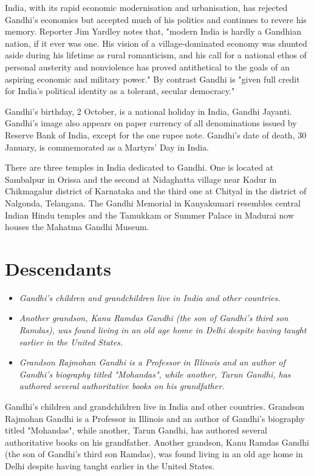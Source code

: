 India, with its rapid economic modernisation and urbanisation, has
rejected Gandhi's economics but accepted much of his politics and
continues to revere his memory. Reporter Jim Yardley notes that, "modern
India is hardly a Gandhian nation, if it ever was one. His vision of a
village-dominated economy was shunted aside during his lifetime as rural
romanticism, and his call for a national ethos of personal austerity and
nonviolence has proved antithetical to the goals of an aspiring economic
and military power." By contrast Gandhi is "given full credit for
India's political identity as a tolerant, secular democracy."

Gandhi's birthday, 2 October, is a national holiday in India, Gandhi
Jayanti. Gandhi's image also appears on paper currency of all
denominations issued by Reserve Bank of India, except for the one rupee
note. Gandhi's date of death, 30 January, is commemorated as a Martyrs'
Day in India.

There are three temples in India dedicated to Gandhi. One is located at
Sambalpur in Orissa and the second at Nidaghatta village near Kadur in
Chikmagalur district of Karnataka and the third one at Chityal in the
district of Nalgonda, Telangana. The Gandhi Memorial in Kanyakumari
resembles central Indian Hindu temples and the Tamukkam or Summer Palace
in Madurai now houses the Mahatma Gandhi Museum.

\section{Descendants}\label{descendants}

\begin{itemize}
\item
  \emph{Gandhi's children and grandchildren live in India and other
  countries.}
\item
  \emph{Another grandson, Kanu Ramdas Gandhi (the son of Gandhi's third
  son Ramdas), was found living in an old age home in Delhi despite
  having taught earlier in the United States.}
\item
  \emph{Grandson Rajmohan Gandhi is a Professor in Illinois and an
  author of Gandhi's biography titled "Mohandas", while another, Tarun
  Gandhi, has authored several authoritative books on his grandfather.}
\end{itemize}

Gandhi's children and grandchildren live in India and other countries.
Grandson Rajmohan Gandhi is a Professor in Illinois and an author of
Gandhi's biography titled "Mohandas", while another, Tarun Gandhi, has
authored several authoritative books on his grandfather. Another
grandson, Kanu Ramdas Gandhi (the son of Gandhi's third son Ramdas), was
found living in an old age home in Delhi despite having taught earlier
in the United States.

